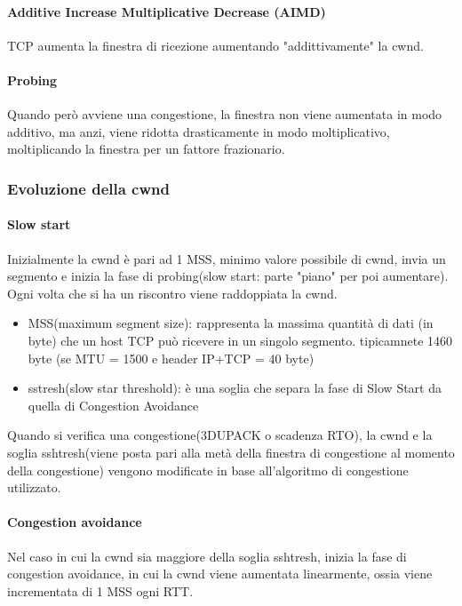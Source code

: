 \paragraph{Additive Increase Multiplicative Decrease (AIMD)}
TCP aumenta la finestra di ricezione aumentando "addittivamente" la cwnd. 
\paragraph{Probing}
Quando però avviene una congestione, la finestra non viene aumentata in modo additivo, ma anzi, viene ridotta drasticamente in modo moltiplicativo, moltiplicando la finestra per un fattore frazionario. 


\subsubsection{Evoluzione della cwnd}

        \paragraph{Slow start}
        Inizialmente la cwnd è pari ad 1 MSS, minimo valore possibile di cwnd, invia un segmento e inizia la fase di probing(slow start: parte "piano" per poi aumentare). Ogni volta che si ha un riscontro viene raddoppiata la cwnd. 

        \begin{itemize}
            \item MSS(maximum segment size): rappresenta la massima quantità di dati (in byte) che un host TCP può ricevere in un singolo segmento.
            tipicamnete 1460 byte (se MTU = 1500 e header IP+TCP = 40 byte)
            \item sstresh(slow star threshold): è una soglia che separa la fase di Slow Start da quella di Congestion Avoidance
        \end{itemize}

        Quando si verifica una congestione(3DUPACK o scadenza RTO), la cwnd e la soglia sshtresh(viene posta pari alla metà della finestra di congestione al momento della congestione) vengono modificate in base all'algoritmo di congestione utilizzato.

        \paragraph{Congestion avoidance}
        Nel caso in cui  la cwnd sia maggiore della soglia sshtresh, inizia la fase di congestion avoidance, in cui la cwnd viene aumentata linearmente, ossia viene incrementata di 1 MSS ogni RTT.


